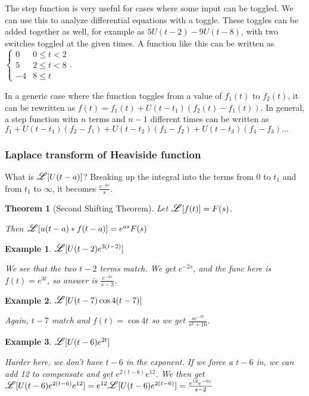 \documentclass{article}
\newtheorem{theorem}{Theorem}
\newtheorem{example}{Example}
\newcommand\laplace{\mathlarger{\mathlarger{\mathscr{L}}}}
\begin{document}
The step function is very useful for cases where some input can be toggled. We can use this to analyze differential equations with a toggle. 
These toggles can be added together as well, for example as $5U(t-2)-9U(t-8)$, with two switches toggled at the given times. A function like this can be 
written as $\begin{cases} 0 & 0 \leq t < 2 \\ 5 & 2 \leq t < 8 \\ -4 & 8 \leq t \end{cases}$.

In a generic case where the function toggles from a value of $f_1(t)$ to $f_2(t)$, it can be rewritten as $f(t)=f_1(t)+U(t-t_1)(f_2(t)-f_1(t))$. 
In general, a step function witn $n$ terms and $n-1$ different times can be written as $f_1+U(t-t_1)(f_2-f_1)+U(t-t_2)(f_3-f_2)+U(t-t_3)(f_4-f_3)...$

\subsubsection{Laplace transform of Heaviside function}

What is $\laplace[U(t-a)]$? Breaking up the integral into the terms from $0$ to $t_1$ and from $t_1$ to $\infty$, it becomes $\frac{e^{-as}}{s}$.


\begin{theorem}[Second Shifting Theorem]
	Let $\laplace[f(t)]=F(s)$.
	
	Then $\laplace[u(t-a)*f(t-a)]=e^{as}F(s)$
\end{theorem}

\begin{example} $\laplace[U(t-2)e^{3(t-2)}]$

	We see that the two $t-2$ terms match. We get $e^{-2s}$, and the func here is $f(t)=e^{3t}$, so answer is $\frac{e^{-2s}}{s-3}$.
\end{example}

\begin{example} $\laplace[U(t-7)\cos{4(t-7)}]$

	Again, $t-7$ match and $f(t)=\cos{4t}$ so we get $\frac{se^{-7t}}{s^2+16}$.
\end{example}

\begin{example} $\laplace[U(t-6)e^{2t}]$

	Harder here, we don't have $t-6$ in the exponent. If we force a $t-6$ in, we can add 12 to compensate and get $e^{2(t-6)}e^{12}$. We then get 
	\\$\laplace[U(t-6)e^{2(t-6)}e^{12}]=e^{12}\laplace[U(t-6)e^{2(t-6)}]=\frac{e^{12}e^{-6s}}{s-2}$
\end{example}
\end{document}
